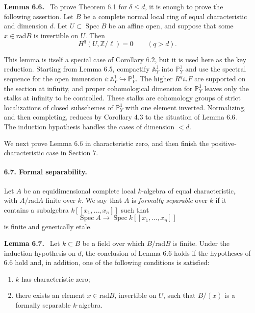 \documentclass[12pt]{article}
\newcommand{\ZZ}{\mathbb Z}
\DeclareMathOperator{\Spec}{Spec}
\newcommand{\rad}{\mathrm{rad}}
\newenvironment{statement}[1]{\par\medskip\noindent\textbf{#1.}\ }{\par\medskip}
\begin{document}
\begin{statement}{Lemma 6.6}
To prove Theorem 6.1 for $\delta\le d$, it is enough to prove the following assertion. Let $B$ be a complete normal local ring of equal characteristic and dimension $d$. Let $U\subset\Spec B$ be an affine open, and suppose that some $x\in\rad B$ is invertible on $U$. Then
\[
   H^q(U,\ZZ/\ell)=0\qquad(q>d).
\]
\end{statement}

This lemma is itself a special case of Corollary 6.2, but it is used here as the key reduction. Starting from Lemma 6.5, compactify $\mathbb A^1_Y$ into $\mathbb P^1_Y$ and use the spectral sequence for the open immersion $i:\mathbb A^1_Y\hookrightarrow\mathbb P^1_Y$. The higher $R^qi_*F$ are supported on the section at infinity, and proper cohomological dimension for $\mathbb P^1_Y$ leaves only the stalks at infinity to be controlled. These stalks are cohomology groups of strict localizations of closed subschemes of $\mathbb P^1_Y$ with one element inverted. Normalizing, and then completing, reduces by Corollary 4.3 to the situation of Lemma 6.6. The induction hypothesis handles the cases of dimension $<d$.

We next prove Lemma 6.6 in characteristic zero, and then finish the positive-characteristic case in Section 7.

\paragraph{6.7. Formal separability.}
Let $A$ be an equidimensional complete local $k$-algebra of equal characteristic, with $A/\rad A$ finite over $k$. We say that $A$ is \emph{formally separable} over $k$ if it contains a subalgebra $k[[x_1,\ldots,x_n]]$ such that
\[
   \Spec A\longrightarrow \Spec k[[x_1,\ldots,x_n]]
\]
is finite and generically etale.

\begin{statement}{Lemma 6.7}
Let $k\subset B$ be a field over which $B/\rad B$ is finite. Under the induction hypothesis on $d$, the conclusion of Lemma 6.6 holds if the hypotheses of 6.6 hold and, in addition, one of the following conditions is satisfied:
\begin{enumerate}[label=(\roman*)]
\item $k$ has characteristic zero;
\item there exists an element $x\in\rad B$, invertible on $U$, such that $B/(x)$ is a formally separable $k$-algebra.
\end{enumerate}
\end{statement}
\end{document}
